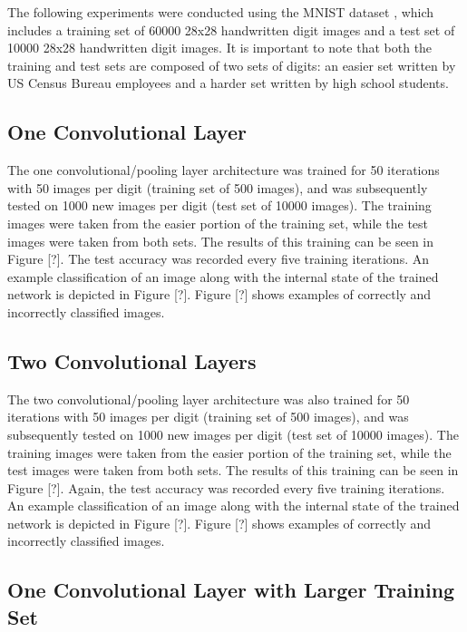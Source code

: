 \documentclass[10pt,twocolumn,letterpaper]{article}
\begin{document}
The following experiments were conducted using the MNIST dataset \cite{MNIST}, which includes a training set of
60000 28x28 handwritten digit images and a test set of 10000 28x28 handwritten digit images. It is important
to note that both the training and test sets are composed of two sets of digits: an easier set written by
US Census Bureau employees and a harder set written by high school students.

\subsection{One Convolutional Layer}

The one convolutional/pooling layer architecture was trained for 50 iterations with 50 images per digit
(training set of 500 images), and was subsequently tested on 1000 new images per digit (test set of 10000 images).
The training images were taken from the easier portion of the training set, while the test images were taken from
both sets. The results of this training can be seen in Figure [?]. The test accuracy was recorded every five training
iterations. An example classification of an image along with the internal state of the trained network is depicted
in Figure [?]. Figure [?] shows examples of correctly and incorrectly classified images.

\subsection{Two Convolutional Layers}

The two convolutional/pooling layer architecture was also trained for 50 iterations with 50 images per digit
(training set of 500 images), and was subsequently tested on 1000 new images per digit (test set of 10000 images).
The training images were taken from the easier portion of the training set, while the test images were taken from both sets.
The results of this training can be seen in Figure [?]. Again, the test accuracy was recorded every five training iterations.
An example classification of an image along with the internal state of the trained network is depicted in Figure [?]. Figure
[?] shows examples of correctly and incorrectly classified images.

\subsection{One Convolutional Layer with Larger Training Set}
\end{document}
